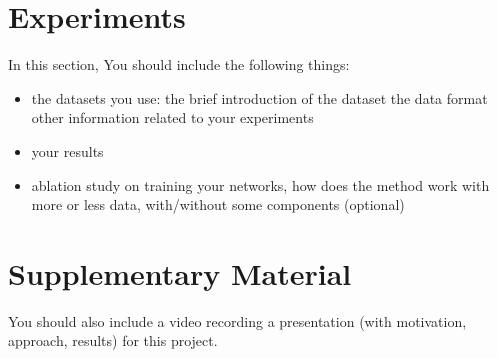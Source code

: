 \documentclass{article}
\begin{document}
\section{Experiments}

In this section, You should include the following things:

\begin{itemize}
    \item the datasets you use:
        \subitem the brief introduction of the dataset
        \subitem the data format
        \subitem other information related to your experiments
    \item your results
    \item ablation study on training your networks, how does the method work with more or less data, with/without some components (optional)
\end{itemize}


\section{Supplementary Material}

You should also include a video recording a presentation (with motivation, approach, results) for this project.



\end{document}

